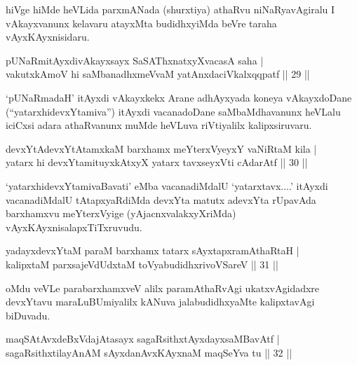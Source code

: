 \begin{artha}
hiVge hiMde heVLida parxmANada (shurxtiya) athaRvu niNaRyavAgiralu I vAkayxvanunx kelavaru atayxMta budidhxyiMda beVre taraha vAyxKAyxnisidaru.
\end{artha}


\begin{shl}
pUNaRmitAyxdivAkayxsayx SaSAThxnatxyXvacasA saha  | \\
vakutxkAmoV hi saMbanadhxmeVvaM yatAnxdaciVkalxqqpatf \hfill||  29 ||  
\end{shl}

\begin{artha}
`pUNaRmadaH' itAyxdi vAkayxkekx Arane adhAyxyada koneya vAkayxdoDane (``yatarxhidevxYtamiva'') itAyxdi vacanadoDane saMbaMdhavanunx heVLalu iciCxsi adara athaRvanunx muMde heVLuva riVtiyalilx kalipxsiruvaru.
\end{artha}


\begin{shl}
devxYtAdevxYtAtamxkaM barxhamx meYterxVyeyxY vaNiRtaM kila  | \\
yatarx hi devxYtamituyxkAtxyX yatarx tavxseyxVti cA\s \s darAtf \hfill||  30 ||  
\end{shl}

\begin{artha}
`yatarxhidevxYtamivaBavati' eMba vacanadiMdalU `yatarxtavx....' itAyxdi vacanadiMdalU tAtapxyaRdiMda devxYta matutx adevxYta rUpavAda barxhamxvu meYterxVyige (yAjacnxvalakxyXriMda) vAyxKAyxnisalapxTiTxruvudu.
\end{artha}

\begin{shl}
yadayxdevxYtaM paraM barxhamx tatarx sAyxtapxramAthaRtaH  | \\
kalipxtaM parxsajeVdUdxtaM toVyabudidhxrivoVSareV \hfill||  31 ||  
\end{shl}

\begin{artha}
oMdu veVLe parabarxhamxveV alilx paramAthaRvAgi ukatxvAgidadxre devxYtavu maraLuBUmiyalilx kANuva jalabudidhxyaMte kalipxtavAgi biDuvadu.
\end{artha}


\begin{shl}
maqSAtAvxdeBxVdajAtasayx sagaRsithxtAyxdayxsaMBavAtf  | \\
sagaRsithxtilayAnAM sAyxdanAvxKAyxnaM maqSeYva tu \hfill||  32 ||  
\end{shl}

